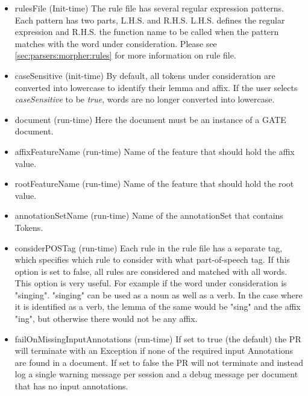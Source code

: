 \begin{itemize}

\item {rulesFile (Init-time)} The rule file has several regular expression patterns.
Each pattern has two parts, L.H.S. and R.H.S. L.H.S. defines the regular
expression and R.H.S. the function name to be called when the pattern matches
with the word under consideration. Please see \ref{sec:parsers:morpher:rules} for more
information on rule file.

\item {caseSensitive (init-time)} By default, all tokens under consideration are
converted into lowercase to identify their lemma and affix. If the user selects
\textit{caseSensitive} to be \textit{true}, words are no longer converted into
lowercase.

\item{document (run-time)} Here the document must be an instance of a GATE
document.

\item{affixFeatureName (run-time)} Name of the feature that should hold the affix value.

\item{rootFeatureName (run-time)} Name of the feature that should hold the root value.

\item{annotationSetName (run-time)} Name of the annotationSet that contains Tokens.

\item{considerPOSTag (run-time)} Each rule in the rule file has a separate tag, which specifies which rule to consider with what part-of-speech tag. If this option is set to false, all rules are considered and matched with all words. This option is very useful. For example if the word under consideration is "singing".  "singing" can be used as a noun as well as a verb. In the case where it is identified as a verb, the lemma of the same would be "sing" and the affix "ing", but otherwise there would not be any affix.

\item{failOnMissingInputAnnotations (run-time)} If set to true (the default) the PR
will terminate with an Exception if none of the required input Annotations are found in 
a document. If set to false the PR will not terminate and instead log a 
single warning message per session and a debug message per document that has no
input annotations.

\end{itemize}


